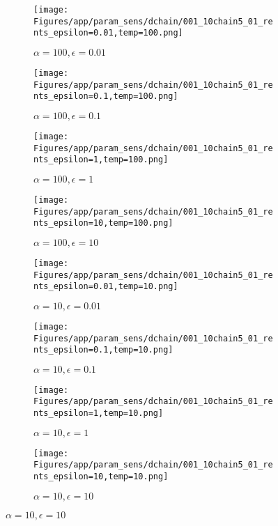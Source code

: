 \documentclass{article}
\theoremstyle{plain}
\begin{document}
\begin{appendices}
\begin{figure}
                \begin{subfigure}[b]{0.24\textwidth}
                    \centering
                    \texttt{[image: Figures/app/param\_sens/dchain/001\_10chain5\_01\_rents\_epsilon=0.01,temp=100.png]}
                    \caption*{$\alpha=100,\epsilon=0.01$}
                \end{subfigure}
                \begin{subfigure}[b]{0.24\textwidth}
                    \centering
                    \texttt{[image: Figures/app/param\_sens/dchain/001\_10chain5\_01\_rents\_epsilon=0.1,temp=100.png]}
                    \caption*{$\alpha=100,\epsilon=0.1$}
                \end{subfigure}
                \begin{subfigure}[b]{0.24\textwidth}
                    \centering
                    \texttt{[image: Figures/app/param\_sens/dchain/001\_10chain5\_01\_rents\_epsilon=1,temp=100.png]}
                    \caption*{$\alpha=100,\epsilon=1$}
                \end{subfigure}
                \begin{subfigure}[b]{0.24\textwidth}
                    \centering
                    \texttt{[image: Figures/app/param\_sens/dchain/001\_10chain5\_01\_rents\_epsilon=10,temp=100.png]}
                    \caption*{$\alpha=100,\epsilon=10$}
                \end{subfigure}
                
                \begin{subfigure}[b]{0.24\textwidth}
                    \centering
                    \texttt{[image: Figures/app/param\_sens/dchain/001\_10chain5\_01\_rents\_epsilon=0.01,temp=10.png]}
                    \caption*{$\alpha=10,\epsilon=0.01$}
                \end{subfigure}
                \begin{subfigure}[b]{0.24\textwidth}
                    \centering
                    \texttt{[image: Figures/app/param\_sens/dchain/001\_10chain5\_01\_rents\_epsilon=0.1,temp=10.png]}
                    \caption*{$\alpha=10,\epsilon=0.1$}
                \end{subfigure}
                \begin{subfigure}[b]{0.24\textwidth}
                    \centering
                    \texttt{[image: Figures/app/param\_sens/dchain/001\_10chain5\_01\_rents\_epsilon=1,temp=10.png]}
                    \caption*{$\alpha=10,\epsilon=1$}
                \end{subfigure}
                \begin{subfigure}[b]{0.24\textwidth}
                    \centering
                    \texttt{[image: Figures/app/param\_sens/dchain/001\_10chain5\_01\_rents\_epsilon=10,temp=10.png]}
                    \caption*{$\alpha=10,\epsilon=10$}
                \end{subfigure}
                

\end{figure}
\end{appendices}
\end{document}
